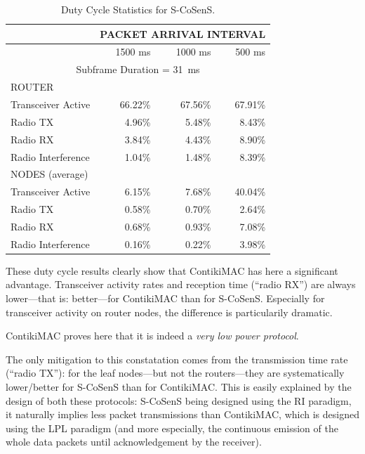 \documentclass[12pt,a4paper]{article}
\begin{document}
\begin{table}[tbph]
\centering
\begin{tabular}{|l|r|r|r|}
\hline
 & \multicolumn{3}{|c|}{PACKET ARRIVAL INTERVAL}\\
\hline
 & 1500 ms & 1000 ms & 500 ms \\
\hline

\multicolumn{4}{|c|}{Subframe Duration = 31~ms}\\
\hline
 ROUTER & \multicolumn{3}{|c|}{ }\\
\hline
Transceiver Active & 66.22\% & 67.56\% & 67.91\% \\
Radio TX           &  4.96\% &  5.48\% &  8.43\% \\
Radio RX           &  3.84\% &  4.43\% &  8.90\% \\
Radio Interference &  1.04\% &  1.48\% &  8.39\% \\
\hline
 NODES (average) & \multicolumn{3}{|c|}{ }\\
\hline
Transceiver Active & 6.15\% & 7.68\% & 40.04\% \\
Radio TX           & 0.58\% & 0.70\% &  2.64\% \\
Radio RX           & 0.68\% & 0.93\% &  7.08\% \\
Radio Interference & 0.16\% & 0.22\% &  3.98\% \\

\hline
\end{tabular}
\caption{Duty Cycle Statistics for S-CoSenS.}
\label{TblDutyCyclesSCoSenS}
\end{table}

\begin{observ}
These duty cycle results clearly show that ContikiMAC has here a significant
advantage. Transceiver activity rates and reception time (``radio RX'')
are always lower---that is: better---for ContikiMAC than for S-CoSenS.
Especially for transceiver activity on router nodes, the difference is
particularily dramatic.
\end{observ}

ContikiMAC proves here that it is indeed a \emph{very low power protocol}.

The only mitigation to this constatation comes from the transmission time
rate (``radio TX''): for the leaf nodes---but not the routers---they are
systematically lower/better for S-CoSenS than for ContikiMAC. This is
easily explained by the design of both these protocols: S-CoSenS being
designed using the RI paradigm, it naturally implies less packet
transmissions than ContikiMAC, which is designed using the LPL
paradigm (and more especially, the continuous emission of the
whole data packets until acknowledgement by the receiver).
\end{document}
